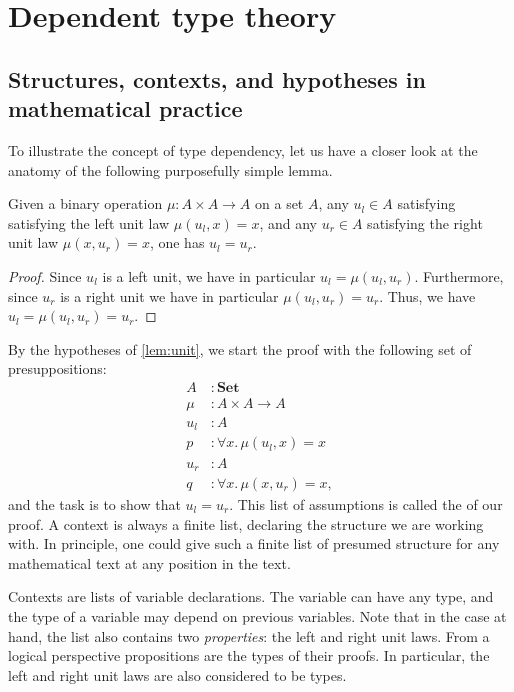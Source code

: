 \chapter{Dependent type theory}

\section{Structures, contexts, and hypotheses in mathematical practice}
To illustrate the concept of type dependency, let us have a closer look at the anatomy of the following purposefully simple lemma.

\begin{lem}\label{lem:unit}
Given a binary operation $\mu:A\times A\to A$ on a set $A$, any $u_l\in A$ satisfying satisfying the left unit law $\mu(u_l,x)=x$, and any $u_r\in A$ satisfying the right unit law $\mu(x,u_r)=x$, one has $u_l=u_r$. 
\end{lem}

\begin{proof}
Since $u_l$ is a left unit, we have in particular $u_l=\mu(u_l,u_r)$. Furthermore, since $u_r$ is a right unit we have in particular $\mu(u_l,u_r)=u_r$. Thus, we have $u_l=\mu(u_l,u_r)=u_r$. 
\end{proof}

By the hypotheses of \autoref{lem:unit}, we start the proof with the following set of presuppositions:
\begin{align*}
A & : \mathbf{Set} \\
\mu & : A\times A\to A \\
u_l & : A \\
p & : \forall x.\,\mu(u_l,x)=x\\
u_r & : A \\
q & : \forall x.\,\mu(x,u_r)=x,
\end{align*}
and the task is to show that $u_l=u_r$.
This list of assumptions is called the  of our proof. A context is always a finite list, declaring the structure we are working with. In principle, one could give such a finite list of presumed structure for any mathematical text at any position in the text.

Contexts are lists of variable declarations. The variable can have any type, and the type of a variable may depend on previous variables.
Note that in the case at hand, the list also contains two \emph{properties}: the left and right unit laws. 
From a logical perspective propositions are the types of their proofs.
In particular, the left and right unit laws are also considered to be types.

